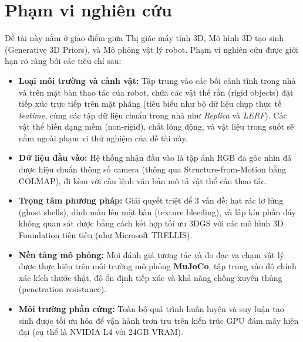 \section{Phạm vi nghiên cứu}
Đề tài này nằm ở giao điểm giữa Thị giác máy tính 3D, Mô hình 3D tạo sinh (Generative 3D Priors), và Mô phỏng vật lý robot. Phạm vi nghiên cứu được giới hạn rõ ràng bởi các tiêu chí sau:

\begin{itemize}
    \item \textbf{Loại môi trường và cảnh vật:} Tập trung vào các bối cảnh tĩnh trong nhà và trên mặt bàn thao tác của robot, chứa các vật thể rắn (rigid objects) đặt tiếp xúc trực tiếp trên mặt phẳng (tiêu biểu như bộ dữ liệu chụp thực tế \textit{teatime}, cùng các tập dữ liệu chuẩn trong nhà như \textit{Replica} và \textit{LERF}). Các vật thể biến dạng mềm (non-rigid), chất lỏng động, và vật liệu trong suốt sẽ nằm ngoài phạm vi thử nghiệm của đề tài này.

    \item \textbf{Dữ liệu đầu vào:} Hệ thống nhận đầu vào là tập ảnh RGB đa góc nhìn đã được hiệu chuẩn thông số camera (thông qua Structure-from-Motion bằng COLMAP), đi kèm với câu lệnh văn bản mô tả vật thể cần thao tác.

    \item \textbf{Trọng tâm phương pháp:} Giải quyết triệt để 3 vấn đề: hạt rác lơ lửng (ghost shells), dính màu lên mặt bàn (texture bleeding), và lấp kín phần đáy không quan sát được bằng cách kết hợp tối ưu 3DGS với các mô hình 3D Foundation tiên tiến (như Microsoft TRELLIS).

    \item \textbf{Nền tảng mô phỏng:} Mọi đánh giá tương tác và đo đạc va chạm vật lý được thực hiện trên môi trường mô phỏng \textbf{MuJoCo}, tập trung vào độ chính xác kích thước thật, độ ổn định tiếp xúc và khả năng chống xuyên thủng (penetration resistance).

    \item \textbf{Môi trường phần cứng:} Toàn bộ quá trình huấn luyện và suy luận tạo sinh được tối ưu hóa để vận hành trơn tru trên kiến trúc GPU đám mây hiện đại (cụ thể là NVIDIA L4 với 24GB VRAM).
\end{itemize}
